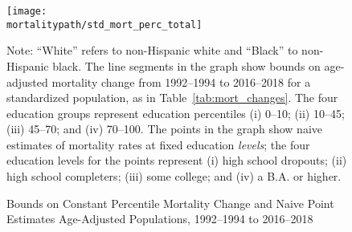 \begin{figure}[H]
  \caption{Bounds on Constant Percentile Mortality Change and Naive
    Point Estimates \cnewline Age-Adjusted Populations, 1992--1994 to 2016--2018}
  \label{fig:bias}
  \begin{center}
    \texttt{[image: \\mortalitypath/std\_mort\_perc\_total]}
  \end{center}
  \footnotesize{Note: ``White'' refers to non-Hispanic white and
    ``Black'' to non-Hispanic black. The line segments in the graph
    show bounds on age-adjusted mortality change from 1992--1994 to
    2016--2018 for a standardized population, as in
    Table~\ref{tab:mort_changes}. The four education groups represent
    education percentiles (i) 0--10; (ii) 10--45; (iii) 45--70; and (iv) 70--100.
    The points in the graph show naive estimates of mortality rates at
    fixed education \textit{levels}; the four education levels for the
    points represent (i) high school dropouts; (ii) high school
    completers; (iii) some college; and (iv) a B.A. or higher.}
\end{figure}

